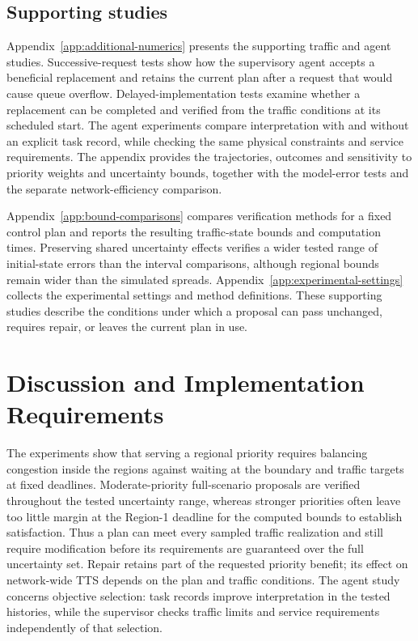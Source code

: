 \documentclass[final]{cas-sc}
\theoremstyle{definition}
\theoremstyle{plain}
\theoremstyle{definition}
\theoremstyle{plain}
\newcommand{\appref}[1]{Appendix~\ref{#1}}
\begin{document}
\subsection{Supporting studies}
\label{sec:supporting-studies}

\appref{app:additional-numerics} presents the supporting traffic and
agent studies. Successive-request tests show how the supervisory agent
accepts a beneficial replacement and retains the current plan after a
request that would cause queue overflow. Delayed-implementation tests
examine whether a replacement can be completed and verified from the
traffic conditions at its scheduled start. The agent experiments compare
interpretation with and without an explicit task record, while checking
the same physical constraints and service requirements. The appendix
provides the trajectories, outcomes and sensitivity to priority weights
and uncertainty bounds, together with the model-error tests and the
separate network-efficiency comparison.

\appref{app:bound-comparisons} compares verification methods for a fixed
control plan and reports the resulting traffic-state bounds and
computation times. Preserving shared uncertainty effects verifies a wider
tested range of initial-state errors than the interval comparisons,
although regional bounds remain wider than the simulated spreads.
\appref{app:experimental-settings} collects the experimental settings
and method definitions. These supporting studies describe the conditions
under which a proposal can pass unchanged, requires repair, or leaves the
current plan in use.

\section{Discussion and Implementation Requirements}
\label{sec:new-discussion}
\label{sec:information-model-scope}

The experiments show that serving a regional priority requires
balancing congestion inside the regions against waiting at the
boundary and traffic targets at fixed deadlines. Moderate-priority
full-scenario proposals are verified throughout the tested uncertainty
range, whereas stronger priorities often leave too little margin at
the Region-1 deadline for the computed bounds to establish satisfaction.
Thus a plan can meet every sampled traffic realization and still require
modification before its requirements are guaranteed over the full
uncertainty set. Repair retains part of the requested priority benefit;
its effect on network-wide TTS depends on the plan and traffic conditions.
The agent study concerns
objective selection: task records improve interpretation in the tested
histories, while the supervisor checks traffic limits and service
requirements independently of that selection.
\end{document}
